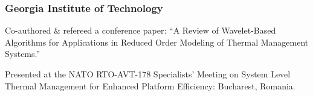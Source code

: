 \subsubsection{Georgia Institute of Technology}
%
\begin{position}
  \begin{myitem}
  \item Co-authored \& refereed a conference paper: ``A Review of Wavelet-Based Algorithms for
    Applications in Reduced Order Modeling of Thermal Management Systems.''
  \item Presented at the NATO RTO-AVT-178 Specialists' Meeting on System Level Thermal Management for
    Enhanced Platform Efficiency: Bucharest, Romania.
  \end{myitem}
\end{position}
